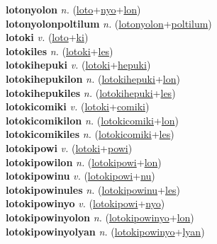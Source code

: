 \textbf{lotonyolon} \textit{n.} (\hyperref[loto]{loto}+\hyperref[nyo]{nyo}+\hyperref[lon]{lon})
 \label{lotonyolon} \\
\textbf{lotonyolonpoltilum} \textit{n.} (\hyperref[lotonyolon]{lotonyolon}+\hyperref[poltilum]{poltilum})
 \label{lotonyolonpoltilum} \\
\textbf{lotoki} \textit{v.} (\hyperref[loto]{loto}+\hyperref[ki]{ki})
 \label{lotoki} \\
\textbf{lotokiles} \textit{n.} (\hyperref[lotoki]{lotoki}+\hyperref[les]{les})
 \label{lotokiles} \\
\textbf{lotokihepuki} \textit{v.} (\hyperref[lotoki]{lotoki}+\hyperref[hepuki]{hepuki})
 \label{lotokihepuki} \\
\textbf{lotokihepukilon} \textit{n.} (\hyperref[lotokihepuki]{lotokihepuki}+\hyperref[lon]{lon})
 \label{lotokihepukilon} \\
\textbf{lotokihepukiles} \textit{n.} (\hyperref[lotokihepuki]{lotokihepuki}+\hyperref[les]{les})
 \label{lotokihepukiles} \\
\textbf{lotokicomiki} \textit{v.} (\hyperref[lotoki]{lotoki}+\hyperref[comiki]{comiki})
 \label{lotokicomiki} \\
\textbf{lotokicomikilon} \textit{n.} (\hyperref[lotokicomiki]{lotokicomiki}+\hyperref[lon]{lon})
 \label{lotokicomikilon} \\
\textbf{lotokicomikiles} \textit{n.} (\hyperref[lotokicomiki]{lotokicomiki}+\hyperref[les]{les})
 \label{lotokicomikiles} \\
\textbf{lotokipowi} \textit{v.} (\hyperref[lotoki]{lotoki}+\hyperref[powi]{powi})
 \label{lotokipowi} \\
\textbf{lotokipowilon} \textit{n.} (\hyperref[lotokipowi]{lotokipowi}+\hyperref[lon]{lon})
 \label{lotokipowilon} \\
\textbf{lotokipowinu} \textit{v.} (\hyperref[lotokipowi]{lotokipowi}+\hyperref[nu]{nu})
 \label{lotokipowinu} \\
\textbf{lotokipowinules} \textit{n.} (\hyperref[lotokipowinu]{lotokipowinu}+\hyperref[les]{les})
 \label{lotokipowinules} \\
\textbf{lotokipowinyo} \textit{v.} (\hyperref[lotokipowi]{lotokipowi}+\hyperref[nyo]{nyo})
 \label{lotokipowinyo} \\
\textbf{lotokipowinyolon} \textit{n.} (\hyperref[lotokipowinyo]{lotokipowinyo}+\hyperref[lon]{lon})
 \label{lotokipowinyolon} \\
\textbf{lotokipowinyolyan} \textit{n.} (\hyperref[lotokipowinyo]{lotokipowinyo}+\hyperref[lyan]{lyan})
